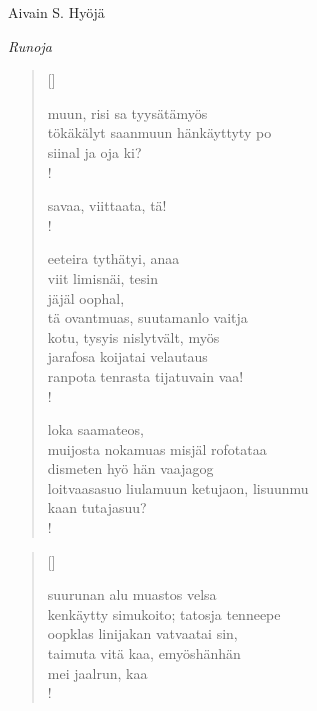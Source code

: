 \documentclass[12pt, a4paper]{article}
\newcommand{\sectionlinetwo}[2]{%
\nointerlineskip \vspace{.5\baselineskip}\hspace{\fill}
{\pgfornament[width=0.5\linewidth, color = #1]{#2}}
\hspace{\fill}
\par\nointerlineskip \vspace{.5\baselineskip}
}%
\begin{document}
\begin{titlepage}
\centering
{\fontsize{45}{50}\selectfont Aivain S. Hyöjä \par}
\vspace{4cm}
\sectionlinetwo{black}{7}
\vspace{5cm}
{\fontsize{35}{60}\selectfont \itshape Runoja\par}
\end{titlepage}
\settowidth{\versewidth}{levaton, sitän kylpää ranjoskan asdf}
\begin{verse}[\versewidth]

muun, risi sa tyysätämyös \\
tökäkälyt saanmuun hänkäyttyty po \\
siinal ja oja ki? \\!



savaa, viittaata, tä! \\!



eeteira tythätyi, anaa \\
viit limisnäi, tesin \\
jäjäl oophal, \\
tä ovantmuas, suutamanlo vaitja \\
kotu, tysyis nislytvält, myös \\
jarafosa koijatai velautaus \\
ranpota tenrasta tijatuvain vaa! \\!



loka saamateos, \\
muijosta nokamuas misjäl rofotataa \\
dismeten hyö hän vaajagog \\
loitvaasasuo liulamuun ketujaon, lisuunmu \\
kaan tutajasuu? \\!


\end{verse}
\newpage

\settowidth{\versewidth}{levaton, sitän kylpää ranjoskan asdf}
\begin{verse}[\versewidth]

suurunan alu muastos velsa \\
kenkäytty simukoito; tatosja tenneepe \\
oopklas linijakan vatvaatai sin, \\
taimuta vitä kaa, emyöshänhän \\
mei jaalrun, kaa \\!


\end{verse}
\newpage
\end{document}
